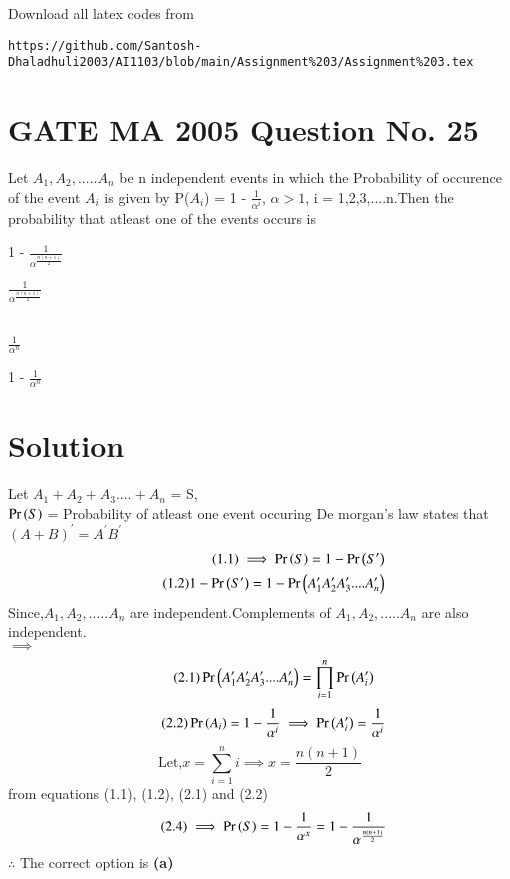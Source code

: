 \documentclass[journal,12pt,twocolumn]{IEEEtran}
\begin{document}
Download all latex codes from 
\begin{lstlisting}
https://github.com/Santosh-Dhaladhuli2003/AI1103/blob/main/Assignment%203/Assignment%203.tex
\end{lstlisting}
\section{\textbf{GATE MA 2005 Question No. 25}}
Let $A_{1},A_{2},.....A_{n}$ be n independent events in which the Probability of occurence of the event $A_{i}$ is given by P($A_{i}$) = 1 - $\frac{1}{\alpha^i}$, $\alpha >1$, i = 1,2,3,....n.Then the probability that atleast one of the events occurs is

\begin{inparaenum}[(a)]
    \item  1 - $\frac{1}{\alpha^\frac{n(n+1)}{2}}$ \hspace{0.95cm}
    \item  $\frac{1}{\alpha^\frac{n(n+1)}{2}}$\hspace{1.5cm}
    \\ \\
    \item  $\frac{1}{\alpha^n}$ \hspace{2.15cm}
    \item 1 - $\frac{1}{\alpha^n}$\hspace{0.95cm}
  \end{inparaenum}

\section{\textbf{Solution}}
Let $A_{1} + A_{2} + A_{3} .... + A_{n}$ = S, \\
$\Pr\left(S\right)$ = Probability of atleast one event occuring
De morgan's law states that $(A + B)^\prime = A^\prime B^\prime$  
\begin{align}
    \tag{1.1}
   \implies \Pr\left(S\right) = 1 - \Pr\left(S^\prime\right) \\ 
   \tag{1.2}
   1 - \Pr\left(S^\prime\right)= 1 - \Pr\left(A_{1}^\prime A_{2}^\prime A_{3}^\prime
   ....A_{n}^\prime\right)
\end{align}
Since,$A_{1},A_{2},.....A_{n}$ are independent.Complements of $A_{1},A_{2},.....A_{n}$ are also independent. \\
$\implies$ 
\begin{equation}
\tag{2.1}
\Pr\left(A_{1}^\prime A_{2}^\prime A_{3}^\prime
   ....A_{n}^\prime\right)=\prod_{i=1}^{n}\Pr\left(A_{i}^\prime\right)
\end{equation}
\begin{equation}
    \tag{2.2}
\Pr\left(A_{i}\right) = 1 - \frac{1}{\alpha^i} \implies \Pr\left(A_{i}^\prime\right) = \frac{1}{\alpha^i}
\end{equation}
\begin{equation}
    \tag{2.3}
\text{Let,} x = \sum_{i=1}^{n}i
\implies x = \frac{n(n+1)}{2}
\end{equation}
from equations (1.1), (1.2), (2.1) and (2.2)
\begin{equation}
\tag{2.4}
\implies \Pr\left(S\right) = 1 - \frac{1}{\alpha^x} = 1 - \frac{1}{\alpha^\frac{n(n+1)}{2}}
\end{equation}
$\therefore$ The correct option is \textbf{(a)}
\end{document}
